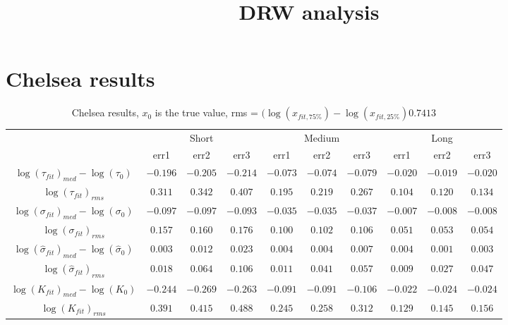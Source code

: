 \documentclass[11pt]{article}
\title{DRW analysis }
\begin{document}
\maketitle\section{Chelsea results}\begin{table}[htp]
	\begin{center}
	\caption{Chelsea results, $x_{0}$ is the true value, rms = $(\log(x_{fit,75\%}) - \log(x_{fit,25\%} ) 0.7413$ }
		\begin{tabular}{cccccccccc}
		\toprule
			{} & \multicolumn{3}{c}{Short} & \multicolumn{3}{c}{Medium} & \multicolumn{3}{c}{Long}\\\cmidrule(r){2-4}\cmidrule(r){5-7}\cmidrule(r){8-10}
			{} & {err1} & {err2} & {err3} & {err1} & {err2} & {err3} & {err1} & {err2} & {err3}\\
			\midrule
			$\log(\tau_{fit})_{med}- \log(\tau_{0})$ & $-0.196$ & $-0.205$ & $-0.214$ & $-0.073$ & $-0.074$ & $-0.079$ & $-0.020$ & $-0.019$ & $-0.020$\\
			$\log(\tau_{fit})_{rms}$ & $0.311$ & $0.342$ & $0.407$ & $0.195$ & $0.219$ & $0.267$ & $0.104$ & $0.120$ & $0.134$\\
			$\log(\sigma_{fit})_{med} -\log(\sigma_{0})$ & $-0.097$ & $-0.097$ & $-0.093$ & $-0.035$ & $-0.035$ & $-0.037$ & $-0.007$ & $-0.008$ & $-0.008$\\
			$\log(\sigma_{fit})_{rms}$ & $0.157$ & $0.160$ & $0.176$ & $0.100$ & $0.102$ & $0.106$ & $0.051$ & $0.053$ & $0.054$\\
			$\log(\hat{\sigma}_{fit})_{med} -\log(\hat{\sigma}_{0})$ & $0.003$ & $0.012$ & $0.023$ & $0.004$ & $0.004$ & $0.007$ & $0.004$ & $0.001$ & $0.003$\\
			$\log(\hat{\sigma}_{fit})_{rms}$ & $0.018$ & $0.064$ & $0.106$ & $0.011$ & $0.041$ & $0.057$ & $0.009$ & $0.027$ & $0.047$\\
			$\log(K_{fit})_{med} -\log(K_{0})$ & $-0.244$ & $-0.269$ & $-0.263$ & $-0.091$ & $-0.091$ & $-0.106$ & $-0.022$ & $-0.024$ & $-0.024$\\
			$\log(K_{fit})_{rms}$ & $0.391$ & $0.415$ & $0.488$ & $0.245$ & $0.258$ & $0.312$ & $0.129$ & $0.145$ & $0.156$\\
		\bottomrule
		\end{tabular}
	\end{center}
\end{table}
\end{document}
